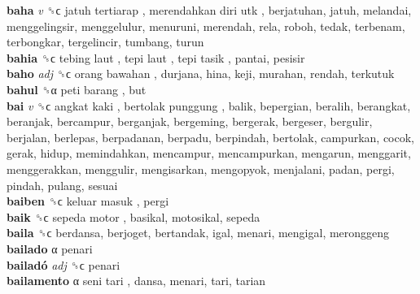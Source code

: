 \textbf{baha} \emph{v}  ␝ϲ   jatuh tertiarap ,  merendahkan diri utk , berjatuhan, jatuh, melandai, menggelingsir, menggelulur, menuruni, merendah, rela, roboh, tedak, terbenam, terbongkar, tergelincir, tumbang, turun  \\
\textbf{bahia} ␝ϲ   tebing laut ,  tepi laut ,  tepi tasik , pantai, pesisir  \\
\textbf{baho} \emph{adj}  ␝ϲ   orang bawahan , durjana, hina, keji, murahan, rendah, terkutuk  \\
\textbf{bahul} ␝α   peti barang , but  \\
\textbf{bai} \emph{v}  ␝ϲ   angkat kaki ,  bertolak punggung , balik, bepergian, beralih, berangkat, beranjak, bercampur, berganjak, bergeming, bergerak, bergeser, bergulir, berjalan, berlepas, berpadanan, berpadu, berpindah, bertolak, campurkan, cocok, gerak, hidup, memindahkan, mencampur, mencampurkan, mengarun, menggarit, menggerakkan, menggulir, mengisarkan, mengopyok, menjalani, padan, pergi, pindah, pulang, sesuai  \\
\textbf{baiben} ␝ϲ   keluar masuk , pergi  \\
\textbf{baik} ␝ϲ   sepeda motor , basikal, motosikal, sepeda  \\
\textbf{baila} ␝ϲ  berdansa, berjoget, bertandak, igal, menari, mengigal, meronggeng  \\
\textbf{bailado} α  penari  \\
\textbf{bailadó} \emph{adj}  ␝ϲ  penari  \\
\textbf{bailamento} α   seni tari , dansa, menari, tari, tarian  \\

